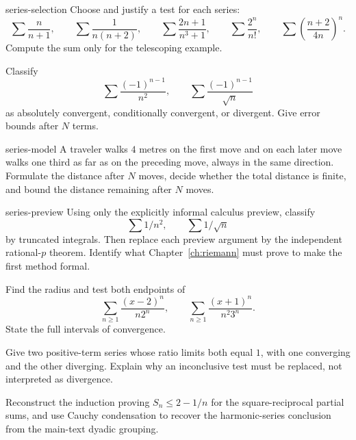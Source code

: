 \begin{hexercise}{series-selection}
Choose and justify a test for each series:
\[
\sum\frac{n}{n+1},\qquad
\sum\frac{1}{n(n+2)},\qquad
\sum\frac{2n+1}{n^3+1},\qquad
\sum\frac{2^n}{n!},\qquad
\sum\left(\frac{n+2}{4n}\right)^n.
\]
Compute the sum only for the telescoping example.
\end{hexercise}

\begin{exercise}
Classify
\[
\sum\frac{(-1)^{n-1}}{n^2},\qquad
\sum\frac{(-1)^{n-1}}{\sqrt n}
\]
as absolutely convergent, conditionally convergent, or divergent. Give error bounds after $N$ terms.
\end{exercise}

\begin{hexercise}{series-model}
A traveler walks $4$ metres on the first move and on each later move walks one third as far as on the preceding move, always in the same direction. Formulate the distance after $N$ moves, decide whether the total distance is finite, and bound the distance remaining after $N$ moves.
\end{hexercise}

\begin{hexercise}{series-preview}
Using only the explicitly informal calculus preview, classify
\[
\sum1/n^2,\qquad \sum1/\sqrt n
\]
 by truncated integrals. Then replace each preview argument by the independent rational-$p$ theorem. Identify what Chapter~\ref{ch:riemann} must prove to make the first method formal.
\end{hexercise}

\begin{exercise}
Find the radius and test both endpoints of
\[
\sum_{n\geq1}\frac{(x-2)^n}{n2^n},\qquad
\sum_{n\geq1}\frac{(x+1)^n}{n^2 3^n}.
\]
State the full intervals of convergence.
\end{exercise}

\begin{exercise}
Give two positive-term series whose ratio limits both equal $1$, with one converging and the other diverging. Explain why an inconclusive test must be replaced, not interpreted as divergence.
\end{exercise}

\begin{exercise}
Reconstruct the induction proving
\(S_n\leq2-1/n\) for the square-reciprocal partial sums, and use Cauchy
condensation to recover the harmonic-series conclusion from the main-text
dyadic grouping.
\end{exercise}

